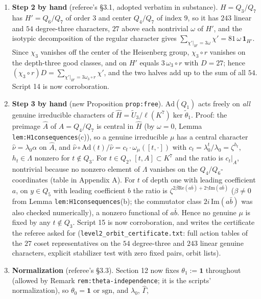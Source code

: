 \documentclass[11pt]{article}
\begin{document}
\begin{enumerate}[leftmargin=*]
\item \textbf{Step 2 by hand} (referee's \S3.1, adopted verbatim in
substance).  $H=Q_3/Q_7$ has $H'=Q_6/Q_7$ of order $3$ and center
$Q_4/Q_7$ of index $9$, so it has $243$ linear and $54$ degree-three
characters, $27$ above each nontrivial $\omega$ of $H'$, and the
isotypic decomposition of the regular character gives
$\sum_{\chi'|_{H'}=3\omega}\chi'=81\,\omega\,\mathbf 1_{H'}$.  Since
$\chi_3$ vanishes off the center of the Heisenberg group, $\chi_3\circ r$
vanishes on the depth-three good classes, and on $H'$ equals
$3\,\omega_3\circ r$ with $D=27$; hence
$(\chi_3\circ r)D=\sum_{\chi'|_{H'}=3\omega_3\circ r}\chi'$, and the
two halves add up to the sum of all $54$.  Script 14 is now
corroboration.
\item \textbf{Step 3 by hand} (new Proposition \texttt{prop:free}).
$\mathrm{Ad}(Q_1)$ acts freely on \emph{all} genuine irreducible
characters of $\hat H=\tilde U_3/\ell(K^7)\ker\tilde\theta_1$.  Proof:
the preimage $\hat A$ of $A=Q_4/Q_7$ is central in $\hat H$ (by
$\omega=0$, Lemma \texttt{lem:H1consequences}(c)), so a genuine
irreducible $\mu$ has a central character $\hat\nu=\lambda_0\alpha$ on
$\hat A$, and $\hat\nu\circ\mathrm{Ad}(t)/\hat\nu=c_t\cdot\omega_\mu([t,\cdot])$
with $c_t=\lambda_0^t/\lambda_0=\zeta^{h_t}$, $h_t\in\Lambda$ nonzero
for $t\notin Q_3$.  For $t\in Q_2$, $[t,A]\subset K^7$ and the ratio is
$c_t|_A$, nontrivial because no nonzero element of $\Lambda$ vanishes on
the $Q_4/Q_6$-coordinates (table in Appendix A).  For $t$ of depth one
with leading coefficient $a$, on $y\in Q_5$ with leading coefficient $b$
the ratio is $\zeta^{2\beta\mathrm{Re}(a\bar b)+2\gamma\mathrm{Im}(a\bar b)}$
($\beta\neq0$ from Lemma \texttt{lem:H1consequences}(b); the commutator
class $2i\,\mathrm{Im}(a\bar b)$ was also checked numerically), a nonzero
functional of $a\bar b$.  Hence no genuine $\mu$ is fixed by any
$t\notin Q_3$.  Script 15 is now corroboration, and writes the
certificate the referee asked for (\texttt{level2\_orbit\_certificate.txt}:
full action tables of the $27$ coset representatives on the $54$
degree-three and $243$ linear genuine characters, explicit stabilizer
test with zero fixed pairs, orbit lists).
\item \textbf{Normalization} (referee's \S3.3).  Section 12 now fixes
$\theta_1:=\mathbf 1$ throughout (allowed by Remark
\texttt{rem:theta-independence}; it is the scripts' normalization), so
$\theta_0=\mathbf 1$ or $\mathrm{sgn}$, and $\lambda_0$, $\hat\Gamma$,

\end{enumerate}
\end{document}
